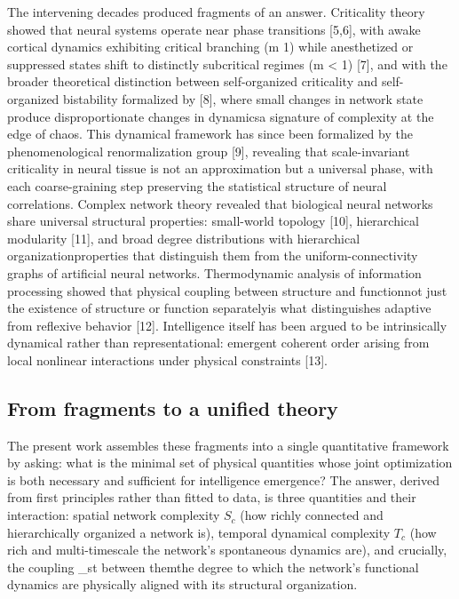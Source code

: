 \documentclass[a4paper,12pt]{article}
\begin{document}
The intervening decades produced fragments of an answer. Criticality theory showed that neural systems operate near phase transitions [5,6], with awake cortical dynamics exhibiting critical branching (m  1) while anesthetized or suppressed states shift to distinctly subcritical regimes (m < 1) [7], and with the broader theoretical distinction between self-organized criticality and self-organized bistability formalized by [8], where small changes in network state produce disproportionate changes in dynamicsa signature of complexity at the edge of chaos. This dynamical framework has since been formalized by the phenomenological renormalization group [9], revealing that scale-invariant criticality in neural tissue is not an approximation but a universal phase, with each coarse-graining step preserving the statistical structure of neural correlations. Complex network theory revealed that biological neural networks share universal structural properties: small-world topology [10], hierarchical modularity [11], and broad degree distributions with hierarchical organizationproperties that distinguish them from the uniform-connectivity graphs of artificial neural networks. Thermodynamic analysis of information processing showed that physical coupling between structure and functionnot just the existence of structure or function separatelyis what distinguishes adaptive from reflexive behavior [12]. Intelligence itself has been argued to be intrinsically dynamical rather than representational: emergent coherent order arising from local nonlinear interactions under physical constraints [13].


\subsection{From fragments to a unified theory}

The present work assembles these fragments into a single quantitative framework by asking: what is the minimal set of physical quantities whose joint optimization is both necessary and sufficient for intelligence emergence? The answer, derived from first principles rather than fitted to data, is three quantities and their interaction: spatial network complexity $S_c$ (how richly connected and hierarchically organized a network is), temporal dynamical complexity $T_c$ (how rich and multi-timescale the network's spontaneous dynamics are), and crucially, the coupling _st between themthe degree to which the network's functional dynamics are physically aligned with its structural organization.
\end{document}
